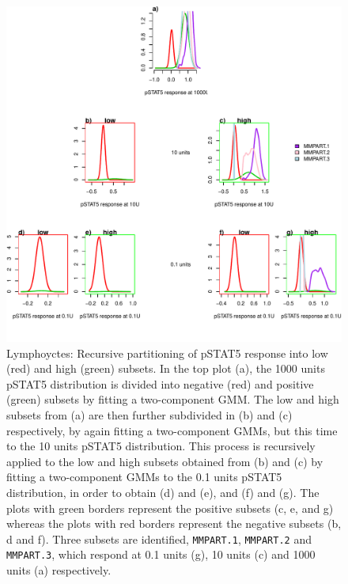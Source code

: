%
\begin{figure}[!h]
\centering
\includegraphics[scale=.7]{figures/mmpart-lymphocytes-tree}
{ Lymphoyctes: Recursive partitioning of pSTAT5 response into low (red) and high (green) subsets. }
{
    In the top plot (a), the 1000 units pSTAT5 distribution is divided into negative (red) and positive (green) subsets by fitting a two-component \gls{GMM}.
    The low and high subsets from (a) are then further subdivided in (b) and (c) respectively, by again fitting a two-component \glspl{GMM},
    but this time to the 10 units pSTAT5 distribution.
    This process is recursively applied to the low and high subsets obtained from (b) and (c) by fitting a two-component \glspl{GMM} to the 0.1 units pSTAT5 distribution, in order
    to obtain (d) and (e), and (f) and (g).
    The plots with green borders represent the positive subsets (c, e, and g) whereas the plots with red borders represent the negative subsets (b, d and f).
    Three subsets are identified, \texttt{MMPART.1}, \texttt{MMPART.2} and \texttt{MMPART.3}, which respond at 0.1 units (g), 10 units (c) and 1000 units (a) respectively.
}
\end{figure}

